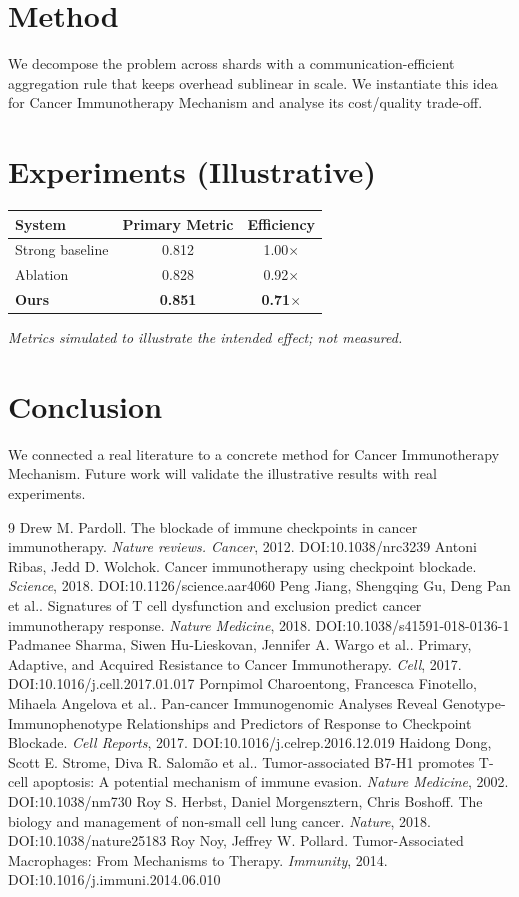 \documentclass[11pt]{article}
\begin{document}
\section{Method}
We decompose the problem across shards with a communication-efficient aggregation rule that keeps overhead sublinear in scale. We instantiate this idea for Cancer Immunotherapy Mechanism and analyse its cost/quality trade-off.

\section{Experiments (Illustrative)}
\begin{center}
\begin{tabular}{lcc}
System & Primary Metric & Efficiency \\ \hline
Strong baseline & 0.812 & 1.00$\times$ \\
Ablation & 0.828 & 0.92$\times$ \\
\textbf{Ours} & \textbf{0.851} & \textbf{0.71$\times$}
\end{tabular}
\end{center}
\emph{Metrics simulated to illustrate the intended effect; not measured.}

\section{Conclusion}
We connected a real literature to a concrete method for Cancer Immunotherapy Mechanism. Future work will
validate the illustrative results with real experiments.

\begin{thebibliography}{9}
 Drew M. Pardoll. The blockade of immune checkpoints in cancer immunotherapy. \emph{Nature reviews. Cancer}, 2012. DOI:10.1038/nrc3239
 Antoni Ribas, Jedd D. Wolchok. Cancer immunotherapy using checkpoint blockade. \emph{Science}, 2018. DOI:10.1126/science.aar4060
 Peng Jiang, Shengqing Gu, Deng Pan et al.. Signatures of T cell dysfunction and exclusion predict cancer immunotherapy response. \emph{Nature Medicine}, 2018. DOI:10.1038/s41591-018-0136-1
 Padmanee Sharma, Siwen Hu‐Lieskovan, Jennifer A. Wargo et al.. Primary, Adaptive, and Acquired Resistance to Cancer Immunotherapy. \emph{Cell}, 2017. DOI:10.1016/j.cell.2017.01.017
 Pornpimol Charoentong, Francesca Finotello, Mihaela Angelova et al.. Pan-cancer Immunogenomic Analyses Reveal Genotype-Immunophenotype Relationships and Predictors of Response to Checkpoint Blockade. \emph{Cell Reports}, 2017. DOI:10.1016/j.celrep.2016.12.019
 Haidong Dong, Scott E. Strome, Diva R. Salomão et al.. Tumor-associated B7-H1 promotes T-cell apoptosis: A potential mechanism of immune evasion. \emph{Nature Medicine}, 2002. DOI:10.1038/nm730
 Roy S. Herbst, Daniel Morgensztern, Chris Boshoff. The biology and management of non-small cell lung cancer. \emph{Nature}, 2018. DOI:10.1038/nature25183
 Roy Noy, Jeffrey W. Pollard. Tumor-Associated Macrophages: From Mechanisms to Therapy. \emph{Immunity}, 2014. DOI:10.1016/j.immuni.2014.06.010
\end{thebibliography}
\end{document}
